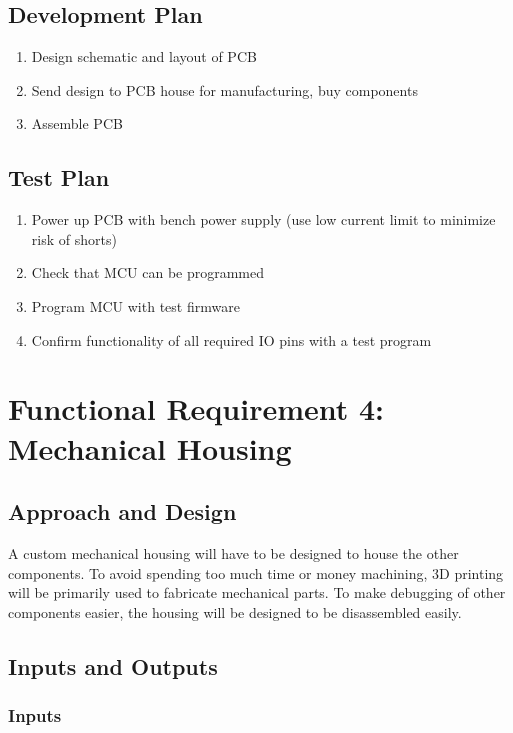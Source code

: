 \documentclass{notes}
\begin{document}
\subsection{Development Plan}

\begin{enumerate}
    \item Design schematic and layout of PCB
    \item Send design to PCB house for manufacturing, buy components
    \item Assemble PCB
\end{enumerate}

\subsection{Test Plan}

\begin{enumerate}
    \item Power up PCB with bench power supply (use low current limit to minimize risk of shorts)
    \item Check that MCU can be programmed
    \item Program MCU with test firmware
    \item Confirm functionality of all required IO pins with a test program
\end{enumerate}

\section{Functional Requirement 4: Mechanical Housing}

\subsection{Approach and Design}

A custom mechanical housing will have to be designed to house the other components.
To avoid spending too much time or money machining, 3D printing will be primarily used to fabricate mechanical parts.
To make debugging of other components easier, the housing will be designed to be disassembled easily.

\subsection{Inputs and Outputs}

\subsubsection{Inputs}
\end{document}
